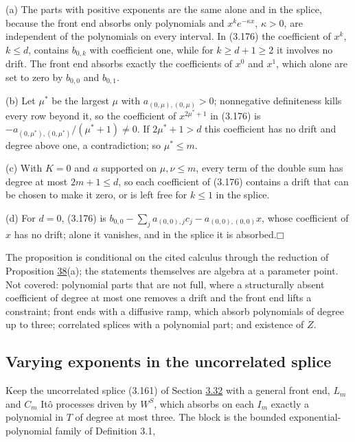 \documentclass[11pt]{article}
\providecommand{\square}{\mdlgwhtsquare}
\begin{document}
(a) The parts with positive exponents are the same alone and in the splice, because the front end absorbs only polynomials and \(x^ke^{-\kappa x}\), \(\kappa>0\), are independent of the polynomials on every interval. In (3.176) the coefficient of \(x^k\), \(k\le d\), contains \(b_{0,k}\) with coefficient one, while for \(k\ge d+1\ge2\) it involves no drift. The front end absorbs exactly the coefficients of \(x^0\) and \(x^1\), which alone are set to zero by \(b_{0,0}\) and \(b_{0,1}\).

(b) Let \(\mu^*\) be the largest \(\mu\) with \(a_{(0,\mu),(0,\mu)}>0\); nonnegative definiteness kills every row beyond it, so the coefficient of \(x^{2\mu^*+1}\) in (3.176) is \(-a_{(0,\mu^*),(0,\mu^*)}/(\mu^*+1)\neq0\). If \(2\mu^*+1>d\) this coefficient has no drift and degree above one, a contradiction; so \(\mu^*\le m\).

(c) With \(K=0\) and \(a\) supported on \(\mu,\nu\le m\), every term of the double sum has degree at most \(2m+1\le d\), so each coefficient of (3.176) contains a drift that can be chosen to make it zero, or is left free for \(k\le1\) in the splice.

(d) For \(d=0\), (3.176) is \(b_{0,0}-\sum_ja_{(0,0),j}c_j-a_{(0,0),(0,0)}x\), whose coefficient of \(x\) has no drift; alone it vanishes, and in the splice it is absorbed.\hfill$\square$

The proposition is conditional on the cited calculus through the reduction of Proposition \hyperref[res:Proposition-38]{38}(a); the statements themselves are algebra at a parameter point. Not covered: polynomial parts that are not full, where a structurally absent coefficient of degree at most one removes a drift and the front end lifts a constraint; front ends with a diffusive ramp, which absorb polynomials of degree up to three; correlated splices with a polynomial part; and existence of \(Z\).

\subsection{Varying exponents in the uncorrelated splice}\label{sec:3.40}

Keep the uncorrelated splice (3.161) of Section \hyperref[sec:3.32]{3.32} with a general front end, \(L_m\) and \(C_m\) Itô processes driven by \(W^S\), which absorbs on each \(I_m\) exactly a polynomial in \(T\) of degree at most three. The block is the bounded exponential-polynomial family of \cite{filipovic2000exponential} Definition 3.1,
\end{document}
